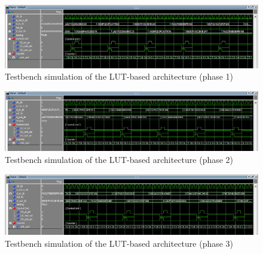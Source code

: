 \begin{figure}[H]
    \begin{center}
        \includegraphics[scale=.6,clip]{img/test_lut_phase1.png}
    \end{center}
    \vspace*{-0.5cm}
    \caption{Testbench simulation of the LUT-based architecture (phase 1)}
    \label{fig:test_lut_phase1}
\end{figure}

\begin{figure}[H]
    \begin{center}
        \includegraphics[scale=.6,clip]{img/test_lut_phase2.png}
    \end{center}
    \vspace*{-0.5cm}
    \caption{Testbench simulation of the LUT-based architecture (phase 2)}
    \label{fig:test_lut_phase2}
\end{figure}

\begin{figure}[H]
    \begin{center}
        \includegraphics[scale=.6,clip]{img/test_lut_phase3.png}
    \end{center}
    \vspace*{-0.5cm}
    \caption{Testbench simulation of the LUT-based architecture (phase 3)}
    \label{fig:test_lut_phase3}
\end{figure}